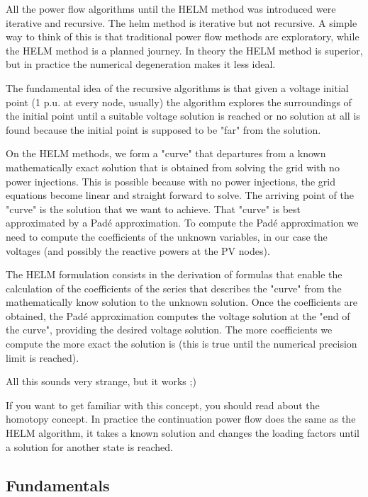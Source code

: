 \documentclass[a4paper,twoside,fleqn]{tufte-book}
\begin{document}
All the power flow algorithms until the HELM method was introduced were iterative and recursive. The helm method is iterative but not recursive. A simple way to think of this is that traditional power flow methods are exploratory, while the HELM method is a planned journey. In theory the HELM method is superior, but in practice the numerical degeneration makes it less ideal.

The fundamental idea of the recursive algorithms is that given a voltage initial point (1 p.u. at every node, usually) the algorithm explores the surroundings of the initial point until a suitable voltage solution is reached or no solution at all is found because the initial point is supposed to be "far" from the solution.

On the HELM methods, we form a "curve" that departures from a known mathematically exact solution that is obtained from solving the grid with no power injections. This is possible because with no power injections, the grid equations become linear and straight forward to solve. The arriving point of the "curve" is the solution that we want to achieve. That "curve" is best approximated by a Pad\'e approximation. To compute the Pad\'e approximation we need to compute the coefficients of the unknown variables, in our case the voltages (and possibly the reactive powers at the PV nodes).

The HELM formulation consists in the derivation of formulas that enable the calculation of the coefficients of the series that describes the "curve" from the mathematically know solution to the unknown solution. Once the coefficients are obtained, the Pad\'e approximation computes the voltage solution at the "end of the curve", providing the desired voltage solution. The more coefficients we compute the more exact the solution is (this is true until the numerical precision limit is reached).\newline 


All this sounds very strange, but it works ;)\newline 


If you want to get familiar with this concept, you should read about the homotopy concept. In practice the continuation power flow does the same as the HELM algorithm, it takes a known solution and changes the loading factors until a solution for another state is reached.

\subsection{Fundamentals} \label{helm_fundamentals}
\end{document}
